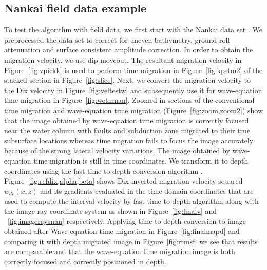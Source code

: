 \documentclass[manuscript]{geophysics}
\begin{document}
\subsection{Nankai field data example}
To test the algorithm with field data, we first start with the Nankai data set \cite[]{forel2005seismic}. We preprocessed the data set to correct for uneven bathymetry, ground roll attenuation and surface consistent amplitude correction. In order to obtain the migration velocity, we use \cite{fowler1984velocity} dip moveout. The resultant migration velocity in Figure~\ref{fig:vpickk} is used to perform  time migration in Figure~\ref{fig:kpstm2} of the stacked section in Figure~\ref{fig:slice}. Next, we convert the migration velocity to the Dix velocity in Figure~\ref{fig:veltestw} and subsequently use it for wave-equation time migration in Figure~\ref{fig:wetmnan}. Zoomed in sections of the conventional time migration and wave-equation time migration (Figure~\ref{fig:zoom,zoom2}) show that the image obtained by wave-equation time migration is correctly focused near the water column with faults and subduction zone migrated to their true subsurface locations whereas time migration fails to focus the image accurately because of the strong lateral velocity variations. The image obtained by wave-equation time migration is still in time coordinates. We transform it to depth coordinates using the fast time-to-depth conversion algorithm \cite[]{sripanich2018fast}. Figure~\ref{fig:refdix,alpha,beta} shows Dix-inverted migration velocity squared $w_{dr}(x,z)$ and its gradients evaluated in the time-domain coordinates that are used to compute the interval velocity by fast time to depth algorithm along with the image ray coordinate system as shown in Figure~\ref{fig:finalv} and ~\ref{fig:imageraysnan} respectively. Applying time-to-depth conversion to image obtained after Wave-equation time migration in Figure~\ref{fig:finalmapd} and comparing it with depth migrated image in Figure~\ref{fig:rtmsf}  we see that results are comparable and that the wave-equation time migration image is both correctly focused and correctly positioned in depth.
\end{document}
